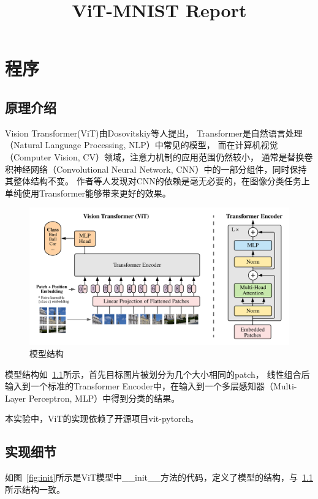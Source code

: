 \documentclass[UTF8]{ctexrep}
\title{ViT-MNIST Report}
\date{}
\begin{document}
\maketitle

\chapter{程序}
\section{原理介绍}
Vision Transformer(ViT)由Dosovitskiy等人\cite{dosovitskiy2021an}提出，
Transformer是自然语言处理（Natural Language Processing, NLP）中常见的模型，
而在计算机视觉（Computer Vision, CV）领域，注意力机制的应用范围仍然较小，
通常是替换卷积神经网络（Convolutional Neural Network, CNN）中的一部分组件，同时保持其整体结构不变。
作者等人发现对CNN的依赖是毫无必要的，在图像分类任务上单纯使用Transformer能够带来更好的效果。

\begin{figure}[htbp]
    \centering
    \includegraphics[width=0.9\linewidth]{model-overview.png}
    \caption{模型结构}
    \label{fig:model-overview}
\end{figure}

模型结构如~\ref{fig:model-overview}所示，首先目标图片被划分为几个大小相同的patch，
线性组合后输入到一个标准的Transformer Encoder中，在输入到一个多层感知器（Multi-Layer Perceptron, MLP）中得到分类的结果。

本实验中，ViT的实现依赖了开源项目vit-pytorch\cite{vit-torch}。

\section{实现细节}
如图~\ref{fig:init}所示是ViT模型中\_\_init\_\_方法的代码，定义了模型的结构，与~\ref{fig:model-overview}所示结构一致。
\end{document}
